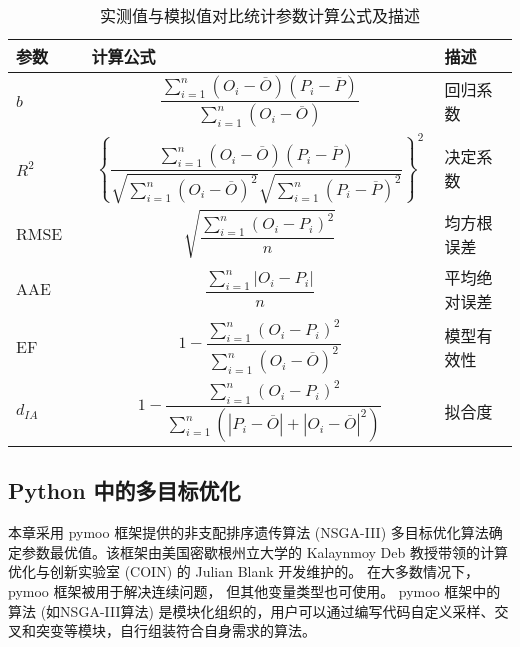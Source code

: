 \begin{table}
    \caption{实测值与模拟值对比统计参数计算公式及描述}
    \begin{tabular}{p{0.15\linewidth}p{0.7\linewidth}p{0.15\linewidth}}
        \toprule
        参数     & 计算公式                                                                                                                                                                      & 描述         \\
        \midrule
        $b$      & \[\frac{\sum_{i=1}^n (O_i - \overline{O}) (P_i - \overline{P})}{\sum_{i=1}^n (O_i - \overline{O})}\]                                                                          & 回归系数     \\
        $R^2$    & \[\left \{ \frac{\sum_{i=1}^n (O_i - \overline{O}) (P_i - \overline{P})}{\sqrt{\sum_{i=1}^n (O_i - \overline{O})^2} \sqrt{\sum_{i=1}^n (P_i - \overline{P})^2}} \right \}^2\] & 决定系数     \\
        RMSE     & \[\sqrt{\frac{\sum_{i=1}^n (O_i - P_i)^2}{n}}\]                                                                                                                               & 均方根误差   \\
        AAE      & \[\frac{\sum_{i=1}^n |O_i - P_i|}{n}\]                                                                                                                                        & 平均绝对误差 \\
        EF       & \[1 - \frac{\sum_{i=1}^n (O_i - P_i)^2}{\sum_{i=1}^n (O_i - \overline{O})^2}\]                                                                                                & 模型有效性   \\
        $d_{IA}$ & \[1 - \frac{\sum_{i=1}^n (O_i - P_i)^2}{\sum_{i=1}^n (|P_i - \overline{O}| + |O_i - \overline{O}|^2)}\]                                                                       & 拟合度       \\
        \bottomrule
    \end{tabular}
\end{table}
\subsection{Python 中的多目标优化}
本章采用 pymoo 框架提供的非支配排序遗传算法 (NSGA-III) 多目标优化算法确定参数最优值。该框架由美国密歇根州立大学的 Kalaynmoy Deb 教授带领的计算优化与创新实验室 (COIN) 的 Julian Blank 开发维护的。%
在大多数情况下，pymoo 框架被用于解决连续问题， 但其他变量类型也可使用。%
pymoo 框架中的算法 (如NSGA-III算法) 是模块化组织的，用户可以通过编写代码自定义采样、交叉和突变等模块，自行组装符合自身需求的算法。%

